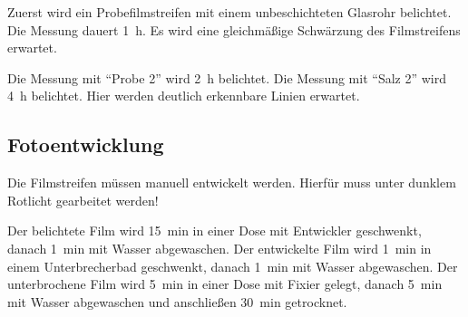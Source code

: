 Zuerst wird ein Probefilmstreifen mit einem unbeschichteten Glasrohr belichtet.
Die Messung dauert \SI{1}{\hour}.
Es wird eine gleichmäßige Schwärzung des Filmstreifens erwartet.

Die Messung mit \enquote{Probe 2} wird \SI{2}{\hour} belichtet.
Die Messung mit \enquote{Salz 2} wird \SI{4}{\hour} belichtet.
Hier werden deutlich erkennbare Linien erwartet.

\subsection{Fotoentwicklung}%
\label{sub:fotoentwicklung}
Die Filmstreifen müssen manuell entwickelt werden.
Hierfür muss unter dunklem Rotlicht gearbeitet werden!

Der belichtete Film wird \SI{15}{\minute} in einer Dose mit Entwickler geschwenkt,
danach \SI{1}{\minute} mit Wasser abgewaschen.
Der entwickelte Film wird \SI{1}{\minute} in einem Unterbrecherbad geschwenkt,
danach \SI{1}{\minute} mit Wasser abgewaschen.
Der unterbrochene Film wird \SI{5}{\minute} in einer Dose mit Fixier gelegt,
danach \SI{5}{\minute} mit Wasser abgewaschen und anschließen \SI{30}{\minute} getrocknet.
